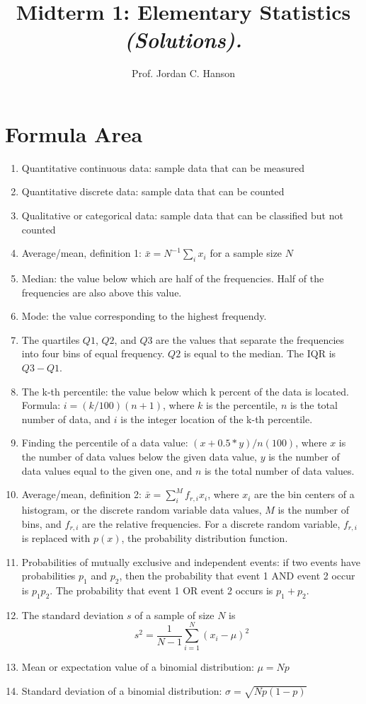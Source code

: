 \documentclass{article}
\begin{document}
\title{Midterm 1: Elementary Statistics \textit{(Solutions).}}
\author{Prof. Jordan C. Hanson}

\maketitle

\section{Formula Area}

\begin{enumerate}
\item Quantitative continuous data: sample data that can be measured
\item Quantitative discrete data: sample data that can be counted
\item Qualitative or categorical data: sample data that can be classified but not counted
\item Average/mean, definition 1: $\bar{x} = N^{-1} \sum_i x_i$ for a sample size $N$
\item Median: the value below which are half of the frequencies.  Half of the frequencies are also above this value.
\item Mode: the value corresponding to the highest frequendy.
\item The quartiles $Q1$, $Q2$, and $Q3$ are the values that separate the frequencies into four bins of equal frequency. $Q2$ is equal to the median.  The IQR is $Q3 - Q1$.
\item The k-th percentile: the value below which k percent of the data is located.  Formula: $i = (k/100) (n+1)$, where $k$ is the percentile, $n$ is the total number of data, and $i$ is the integer location of the k-th percentile.
\item Finding the percentile of a data value: $(x+0.5*y)/n (100)$, where $x$ is the number of data values below the given data value, $y$ is the number of data values equal to the given one, and $n$ is the total number of data values.
\item Average/mean, definition 2: $\bar{x} = \sum_i^{M} f_{r,i} x_i$, where $x_i$ are the bin centers of a histogram, or the discrete random variable data values, $M$ is the number of bins, and $f_{r,i}$ are the relative frequencies.  For a discrete random variable, $f_{r,i}$ is replaced with $p(x)$, the probability distribution function.
\item Probabilities of mutually exclusive and independent events: if two events have probabilities $p_1$ and $p_2$, then the probability that event 1 AND event 2 occur is $p_1 p_2$.  The probability that event 1 OR event 2 occurs is $p_1 + p_2$.
\item The standard deviation $s$ of a sample of size $N$ is 
\begin{equation}
s^2 = \frac{1}{N-1}\sum_{i=1}^N (x_i-\mu)^2
\end{equation}
\item Mean or expectation value of a binomial distribution: $\mu = Np$
\item Standard deviation of a binomial distribution: $\sigma = \sqrt{N p (1-p)}$
\end{enumerate}
\end{document}

